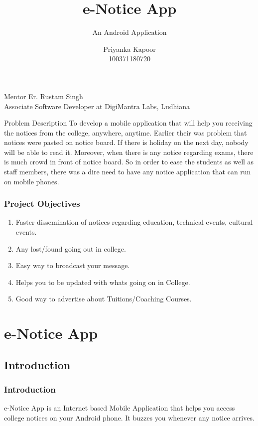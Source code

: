 \documentclass{beamer}   %
\title[priyankacool10.wordpress.com]{e-Notice App}
\subtitle{An Android Application}
\author[Guru Nanak Dev Engineering College]{Priyanka Kapoor \\ 100371180720}
\begin{document}
\frame{\titlepage}

\begin{frame}
\begin{block}{Mentor}
Er. Rustam Singh\\
Associate Software Developer at DigiMantra Labs, Ludhiana
\end{block}
\end{frame}

\begin{frame}
\begin{block}{Problem Description}
To develop a mobile application that will help you receiving the notices from the college, anywhere, anytime. Earlier their was problem that notices were pasted on notice board. If there is holiday on the
next day, nobody will be able to read it. Moreover, when there is any notice regarding exams, there is much crowd
in front of notice board. So in order to ease the students as well as staff members, there was a dire need to have
any notice application that can run on mobile phones.
\end{block}
\end{frame}

\begin{frame}
\frametitle{Project Objectives}
\begin{enumerate}
\item Faster dissemination of notices regarding education, technical events, cultural events.\pause
\item Any lost/found going out in college.\pause
\item Easy way to broadcast your message.\pause
\item Helps you to be updated with whats going on in College.\pause
\item Good way to advertise about Tuitions/Coaching Courses.\pause
\end{enumerate}

\end{frame}

\section{e-Notice App}
\subsection{Introduction}
\begin{frame}
\frametitle{Introduction}
e-Notice App is an Internet based Mobile Application that helps you access college notices on your Android phone. It buzzes you
whenever any notice arrives.
\end{frame}
\end{document}
